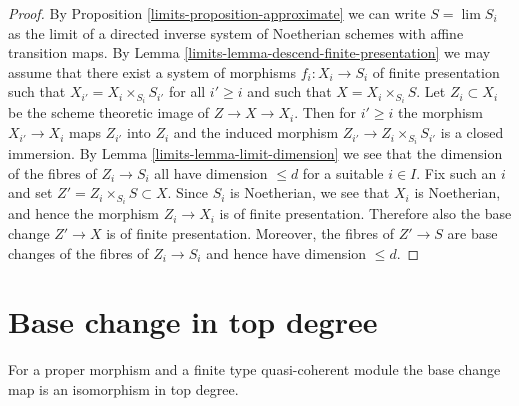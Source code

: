 \begin{proof}

By
Proposition \ref{limits-proposition-approximate}
we can write $S = \lim S_i$ as the limit of a directed inverse
system of Noetherian schemes with affine transition maps. By
Lemma \ref{limits-lemma-descend-finite-presentation}
we may assume that there exist a system of morphisms
$f_i : X_i \to S_i$ of finite presentation such that
$X_{i'} = X_i \times_{S_i} S_{i'}$
for all $i' \geq i$ and such that $X = X_i \times_{S_i} S$.
Let $Z_i \subset X_i$ be the scheme theoretic image of
$Z \to X \to X_i$. Then for $i' \geq i$ the morphism $X_{i'} \to X_i$
maps $Z_{i'}$ into $Z_i$ and the induced morphism
$Z_{i'} \to Z_i \times_{S_i} S_{i'}$ is a closed immersion. By
Lemma \ref{limits-lemma-limit-dimension}
we see that the dimension of the fibres of $Z_i \to S_i$
all have dimension $\leq d$ for a suitable $i \in I$.
Fix such an $i$ and set $Z' = Z_i \times_{S_i} S \subset X$.
Since $S_i$ is Noetherian, we see that $X_i$ is Noetherian, and hence
the morphism $Z_i \to X_i$ is of finite presentation.
Therefore also the base change $Z' \to X$ is of finite presentation.
Moreover, the fibres of $Z' \to S$ are base changes of the fibres
of $Z_i \to S_i$ and hence have dimension $\leq d$.
\end{proof}

\section{Base change in top degree}
\label{limits-section-top-degree}
For a proper morphism and a finite type quasi-coherent module
the base change map is an isomorphism in top degree.

